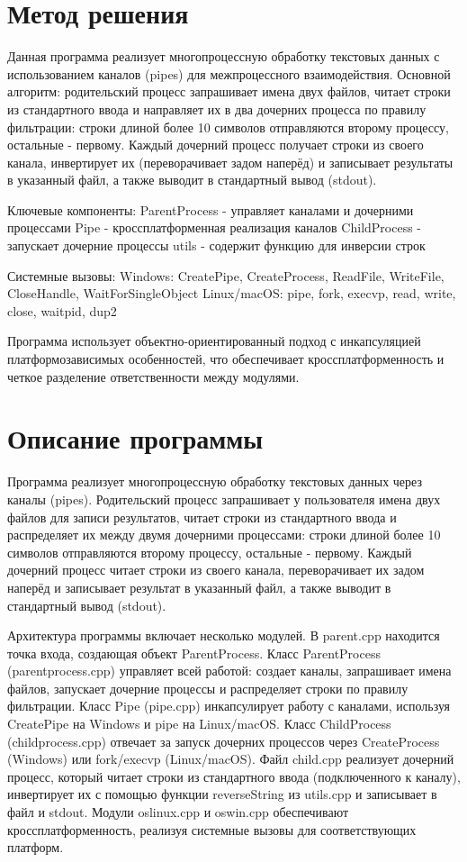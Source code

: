\section{Метод решения}

Данная программа реализует многопроцессную обработку текстовых данных с использованием каналов (pipes) для межпроцессного взаимодействия.  
Основной алгоритм: родительский процесс запрашивает имена двух файлов, читает строки из стандартного ввода и направляет их в два дочерних процесса по правилу фильтрации: строки длиной более 10 символов отправляются второму процессу, остальные - первому. Каждый дочерний процесс получает строки из своего канала, инвертирует их (переворачивает задом наперёд) и записывает результаты в указанный файл, а также выводит в стандартный вывод (stdout).

Ключевые компоненты:  
ParentProcess - управляет каналами и дочерними процессами  
Pipe - кроссплатформенная реализация каналов  
ChildProcess - запускает дочерние процессы  
utils - содержит функцию для инверсии строк  

Системные вызовы:  
Windows: CreatePipe, CreateProcess, ReadFile, WriteFile, CloseHandle, WaitForSingleObject  
Linux/macOS: pipe, fork, execvp, read, write, close, waitpid, dup2  

Программа использует объектно-ориентированный подход с инкапсуляцией платформозависимых особенностей, что обеспечивает кроссплатформенность и четкое разделение ответственности между модулями.

\section{Описание программы}

Программа реализует многопроцессную обработку текстовых данных через каналы (pipes).  
Родительский процесс запрашивает у пользователя имена двух файлов для записи результатов, читает строки из стандартного ввода и распределяет их между двумя дочерними процессами: строки длиной более 10 символов отправляются второму процессу, остальные - первому.  
Каждый дочерний процесс читает строки из своего канала, переворачивает их задом наперёд и записывает результат в указанный файл, а также выводит в стандартный вывод (stdout).  

Архитектура программы включает несколько модулей.  
В parent.cpp находится точка входа, создающая объект ParentProcess.  
Класс ParentProcess (parentprocess.cpp) управляет всей работой: создает каналы, запрашивает имена файлов, запускает дочерние процессы и распределяет строки по правилу фильтрации.  
Класс Pipe (pipe.cpp) инкапсулирует работу с каналами, используя CreatePipe на Windows и pipe на Linux/macOS.  
Класс ChildProcess (childprocess.cpp) отвечает за запуск дочерних процессов через CreateProcess (Windows) или fork/execvp (Linux/macOS).  
Файл child.cpp реализует дочерний процесс, который читает строки из стандартного ввода (подключенного к каналу), инвертирует их с помощью функции reverseString из utils.cpp и записывает в файл и stdout.  
Модули oslinux.cpp и oswin.cpp обеспечивают кроссплатформенность, реализуя системные вызовы для соответствующих платформ.